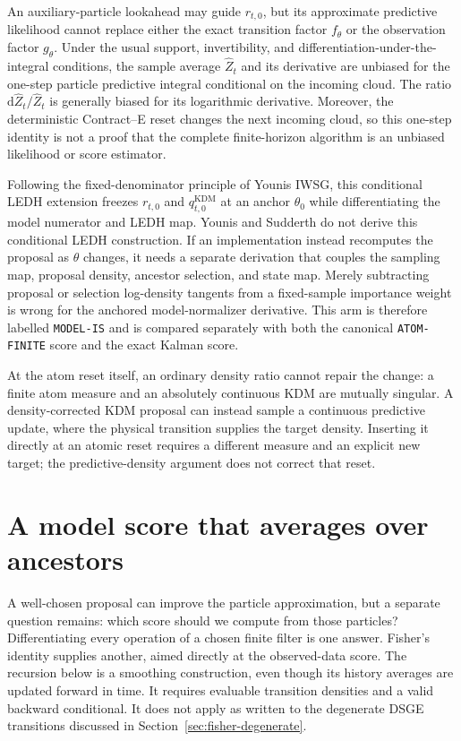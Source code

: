 \documentclass[11pt]{article}
\newcommand{\dd}{\mathrm{d}}
\newcommand{\KDM}{\ensuremath{\mathrm{KDM}}}
\begin{document}
An auxiliary-particle lookahead may guide $r_{t,0}$, but its approximate
predictive likelihood cannot replace either the exact transition factor
$f_\theta$ or the observation factor $g_\theta$.  Under the usual support,
invertibility, and differentiation-under-the-integral conditions, the sample
average $\widehat Z_t$ and its derivative are unbiased for the one-step
particle predictive integral conditional on the incoming cloud.  The ratio
$\dd\widehat Z_t/\widehat Z_t$ is generally biased for its logarithmic
derivative.  Moreover, the deterministic Contract--E reset changes the next
incoming cloud, so this one-step identity is not a proof that the complete
finite-horizon algorithm is an unbiased likelihood or score estimator.

Following the fixed-denominator principle of Younis IWSG, this conditional
LEDH extension freezes $r_{t,0}$ and $q^{\KDM}_{t,0}$ at an anchor $\theta_0$ while
differentiating the model numerator and LEDH map.  Younis and Sudderth do not
derive this conditional LEDH construction.  If an implementation instead
recomputes the proposal as $\theta$ changes, it needs a separate derivation
that couples the sampling map, proposal density, ancestor selection, and state
map.  Merely subtracting proposal or selection log-density tangents from a
fixed-sample importance weight is wrong for the anchored model-normalizer
derivative.  This arm is therefore labelled
\texttt{MODEL-IS} and is compared separately with both the canonical
\texttt{ATOM-FINITE} score and the exact Kalman score.

At the atom reset itself, an ordinary density ratio cannot repair the change:
a finite atom measure and an absolutely continuous KDM are mutually singular.
A density-corrected KDM proposal can instead sample a continuous predictive
update, where the physical transition supplies the target density. Inserting
it directly at an atomic reset requires a different measure and an explicit
new target; the predictive-density argument does not correct that reset.

\section{A model score that averages over ancestors}
\label{sec:fisher}

A well-chosen proposal can improve the particle approximation, but a separate question
remains: which score should we compute from those particles? Differentiating
every operation of a chosen finite filter is one answer. Fisher's identity
supplies another, aimed directly at the observed-data score. The recursion
below is a smoothing construction, even though its history averages are
updated forward in time. It requires evaluable transition densities and a
valid backward conditional. It does not apply as written to the degenerate
DSGE transitions discussed in Section~\ref{sec:fisher-degenerate}.
\end{document}
